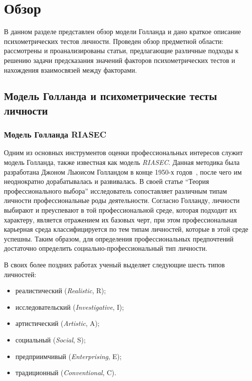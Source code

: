
\section{Обзор}
\label{sec:relatedworks}

В данном разделе представлен обзор модели Голланда и дано краткое описание психометрических тестов личности. Проведен обзор предметной области: рассмотрены и проанализированы статьи, предлагающие различные подходы к решению задачи предсказания значений факторов психометрических тестов и нахождения взаимосвязей между факторами.

\subsection{Модель Голланда и психометрические тесты личности}
\subsubsection{Модель Голланда RIASEC}

Одним из основных инструментов оценки профессиональных интересов служит модель Голланда, также известная как модель \textit{RIASEC}. Данная методика была разработана Джоном Льюисом Голландом в конце 1950-х годов~\cite{Holland1959}, после чего им неоднократно дорабатывалась и развивалась. В своей статье \enquote{Теория профессионального выбора} исследователь сопоставляет различным типам личности профессиональные роды деятельности. Согласно Голланду, личности выбирают и преуспевают в той профессиональной среде, которая подходит их характеру, является отражением их базовых черт, при этом профессиональная карьерная среда классифицируется по тем типам личностей, которые в этой среде успешны. Таким образом, для определения профессиональных предпочтений достаточно определить социально-профессиональный тип личности.

В своих более поздних работах ученый выделяет следующие шесть типов личностей:
\begin{itemize}[noitemsep, topsep=0pt, parsep=0pt, partopsep=0pt]
  \item реалистический (\textit{Realistic}, R);
  \item исследовательский (\textit{Investigative}, I);
  \item артистический (\textit{Artistic}, A);
  \item социальный (\textit{Social}, S);
  \item предприимчивый (\textit{Enterprising}, E);
  \item традиционный (\textit{Conventional}, C).
\end{itemize}


